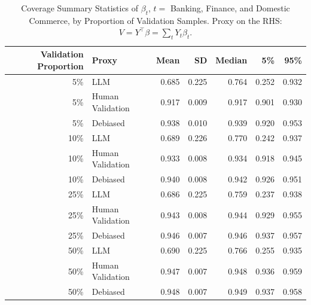 \begin{table}

\caption{\label{tab:unnamed-chunk-1}Coverage Summary Statistics of $\beta_{t}$, $t=$ Banking, Finance, and Domestic Commerce, by Proportion of Validation Samples.
      Proxy on the RHS: $V = Y^\top \beta = \sum_{t} Y_t \beta_t$.}
\centering
\begin{tabular}[t]{rlrrrrr}
\toprule
Validation Proportion & Proxy & Mean & SD & Median & 5\% & 95\%\\
\midrule
5\% & LLM & 0.685 & 0.225 & 0.764 & 0.252 & 0.932\\
5\% & Human Validation & 0.917 & 0.009 & 0.917 & 0.901 & 0.930\\
5\% & Debiased & 0.938 & 0.010 & 0.939 & 0.920 & 0.953\\
10\% & LLM & 0.689 & 0.226 & 0.770 & 0.242 & 0.937\\
10\% & Human Validation & 0.933 & 0.008 & 0.934 & 0.918 & 0.945\\
10\% & Debiased & 0.940 & 0.008 & 0.942 & 0.926 & 0.951\\
25\% & LLM & 0.686 & 0.225 & 0.759 & 0.237 & 0.938\\
25\% & Human Validation & 0.943 & 0.008 & 0.944 & 0.929 & 0.955\\
25\% & Debiased & 0.946 & 0.007 & 0.946 & 0.937 & 0.957\\
50\% & LLM & 0.690 & 0.225 & 0.766 & 0.255 & 0.935\\
50\% & Human Validation & 0.947 & 0.007 & 0.948 & 0.936 & 0.959\\
50\% & Debiased & 0.948 & 0.007 & 0.949 & 0.937 & 0.958\\
\bottomrule
\end{tabular}
\end{table}
